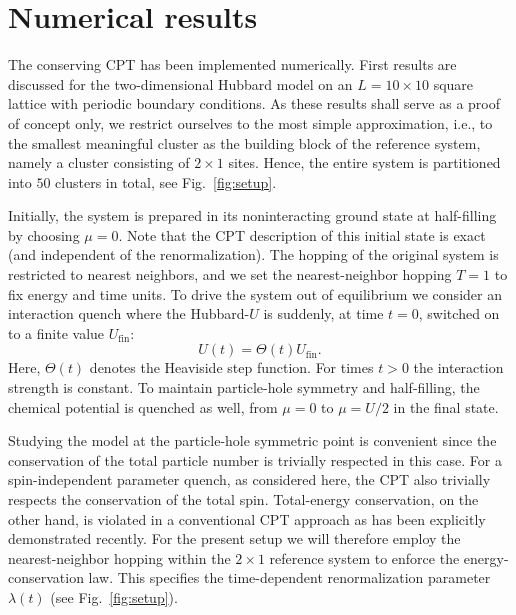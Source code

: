 \documentclass[twocolumn,prb,showpacs,aps,superscriptaddress]{revtex4}
\begin{document}
\section{Numerical results}
\label{sec:num}

The conserving CPT has been implemented numerically.  First results are
discussed for the two-dimensional Hubbard model on an $L=10 \times 10$ square
lattice with periodic boundary conditions.  As these results shall serve as a
proof of concept only, we restrict ourselves to the most simple approximation,
i.e., to the smallest meaningful cluster as the building block of the reference
system, namely a cluster consisting of $2 \times 1$ sites.  Hence, the entire
system is partitioned into $50$ clusters in total, see Fig.\ \ref{fig:setup}.

Initially, the system is prepared in its noninteracting ground state at
half-filling by choosing $\mu = 0$.  Note that the CPT description of this
initial state is exact (and independent of the renormalization).  The hopping
of the original system is restricted to nearest neighbors, and we set the
nearest-neighbor hopping $T=1$ to fix energy and time units.  To drive the
system out of equilibrium we consider an interaction quench where the
Hubbard-$U$ is suddenly, at time $t=0$, switched on to a finite value
$U_{\text{fin}}$: 
\begin{equation} 
  U(t)=\Theta(t) U_\text{fin}.  
\end{equation}
Here, $\Theta(t)$ denotes the Heaviside step function.  For times $t > 0$ the
interaction strength is constant.  To maintain particle-hole symmetry and
half-filling, the chemical potential is quenched as well, from $\mu=0$ to
$\mu= U/2$ in the final state.

Studying the model at the particle-hole symmetric point is convenient since the
conservation of the total particle number is trivially respected in this case.
\cite{JP13} For a spin-independent parameter quench, as considered here, the
CPT also trivially respects the conservation of the total spin.  Total-energy
conservation, on the other hand, is violated in a conventional CPT approach as
has been explicitly demonstrated recently. \cite{GP15} For the present setup we
will therefore employ the nearest-neighbor hopping within the $2 \times 1$
reference system to enforce the energy-conservation law.  This specifies the
time-dependent renormalization parameter $\lambda(t)$ (see Fig.\
\ref{fig:setup}).
\end{document}

